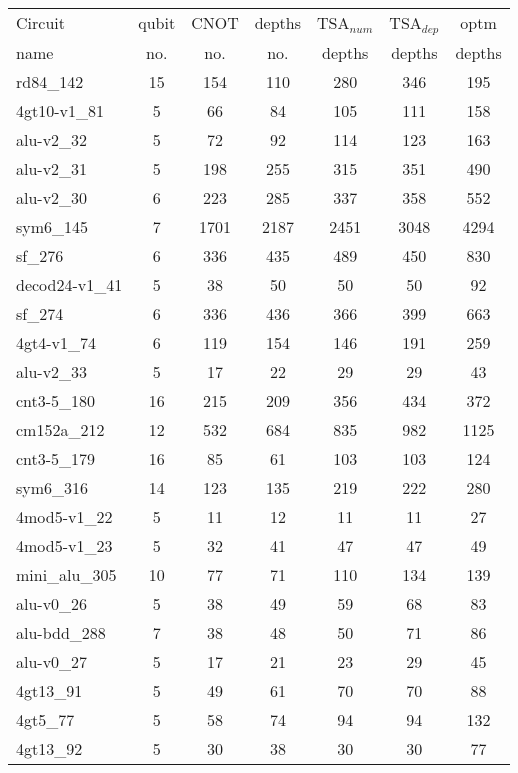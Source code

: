 \documentclass[journal]{IEEEtran}
\begin{document}
	\begin{table*}[htbp]
		\begin{center}  
			\begin{tabular}{|p{4.3cm}<{\centering}|c|c|c|c|c|c|}
				\hline
				Circuit &  qubit  & CNOT &depths &TSA$_{num}$& TSA$_{dep}$  & optm 	  	\\
				name	&   no. 	&	no. & no. & depths&  depths &  depths 	\\
				\hline
				rd84\_142 & 15 & 154 & 110 & 280 & 346 & 195 \\ 
				4gt10-v1\_81 & 5 & 66 & 84 & 105 & 111 & 158 \\ 
				alu-v2\_32 & 5 & 72 & 92 & 114 & 123 & 163 \\ 
				alu-v2\_31 & 5 & 198 & 255 & 315 & 351 & 490 \\ 
				alu-v2\_30 & 6 & 223 & 285 & 337 & 358 & 552 \\ 
				sym6\_145 & 7 & 1701 & 2187 & 2451 & 3048 & 4294 \\ 
				sf\_276 & 6 & 336 & 435 & 489 & 450 & 830 \\ 
				decod24-v1\_41 & 5 & 38 & 50 & 50 & 50 & 92 \\ 
				sf\_274 & 6 & 336 & 436 & 366 & 399 & 663 \\ 
				4gt4-v1\_74 & 6 & 119 & 154 & 146 & 191 & 259 \\ 
				alu-v2\_33 & 5 & 17 & 22 & 29 & 29 & 43 \\ 
				cnt3-5\_180 & 16 & 215 & 209 & 356 & 434 & 372 \\ 
				cm152a\_212 & 12 & 532 & 684 & 835 & 982 & 1125 \\ 
				cnt3-5\_179 & 16 & 85 & 61 & 103 & 103 & 124 \\ 
				sym6\_316 & 14 & 123 & 135 & 219 & 222 & 280 \\ 
				4mod5-v1\_22 & 5 & 11 & 12 & 11 & 11 & 27 \\ 
				4mod5-v1\_23 & 5 & 32 & 41 & 47 & 47 & 49 \\ 
				mini\_alu\_305 & 10 & 77 & 71 & 110 & 134 & 139 \\ 
				alu-v0\_26 & 5 & 38 & 49 & 59 & 68 & 83 \\ 
				alu-bdd\_288 & 7 & 38 & 48 & 50 & 71 & 86 \\ 
				alu-v0\_27 & 5 & 17 & 21 & 23 & 29 & 45 \\ 
				4gt13\_91 & 5 & 49 & 61 & 70 & 70 & 88 \\ 
				4gt5\_77 & 5 & 58 & 74 & 94 & 94 & 132 \\ 
				4gt13\_92 & 5 & 30 & 38 & 30 & 30 & 77 \\ 

\end{tabular}
\end{center}
\end{table*}
\end{document}
